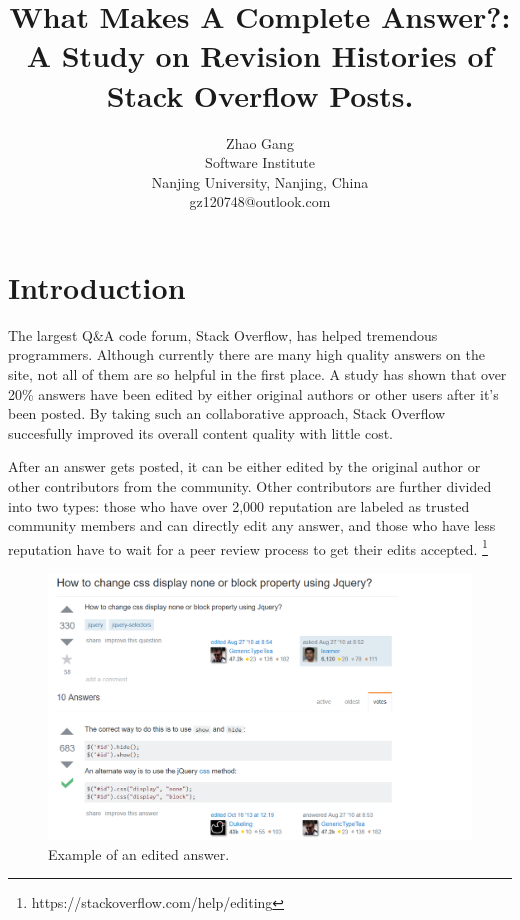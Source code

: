 \documentclass[10pt,conference]{IEEEtran}
\begin{document}
\title{What Makes A Complete Answer?: A Study on Revision Histories of Stack Overflow Posts.} 
\author{Zhao Gang\\
Software Institute\\
Nanjing University, Nanjing, China\\
gz120748@outlook.com
}
\maketitle

\section {Introduction}
The largest Q\&A code forum, Stack Overflow, has helped tremendous programmers. Although currently there are many high quality answers on the site, not all of them are so helpful in the first place. A study has shown that over 20\% answers have been edited by either original authors or other users after it's been posted. \cite{7208aa781175403f9c3aaddc19f3b8cf} By taking such an collaborative approach, Stack Overflow succesfully improved its overall content quality with little cost. \cite{Chen:2017:CCD:3171581.3134667}

After an answer gets posted, it can be either edited by the original author or other contributors from the community. Other contributors are further divided into two types: those who have over 2,000 reputation are labeled as trusted community members and can directly edit any answer, and those who have less reputation have to wait for a peer review process to get their edits accepted. \footnote{https://stackoverflow.com/help/editing} 

\begin{figure}
  \includegraphics[width=\linewidth]{figure1.png}
  \caption{Example of an edited answer.}
  \label{fig:jqueryAnswer}
\end{figure}
\end{document}
